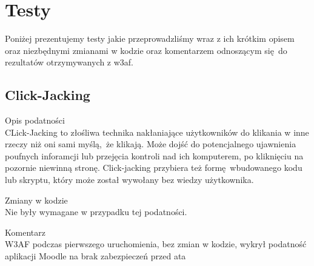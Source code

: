 \chapter{Testy}
\label{cha:testy}

Poniżej prezentujemy testy jakie przeprowadzliśmy wraz z ich krótkim opisem oraz niezbędnymi zmianami w kodzie oraz komentarzem odnoszącym się do rezultatów otrzymywanych z w3af.

\section{Click-Jacking}
\begin{enumerable}
\item Opis podatności\\
CLick-Jacking to złośliwa technika nakłaniające użytkowników do klikania w inne rzeczy niż oni sami myślą, że klikają.
Może dojść do potencjalnego ujawnienia poufnych inforamcji lub przejęcia kontroli nad ich komputerem, po kliknięciu na pozornie niewinną stronę. Click-jacking przybiera też formę wbudowanego kodu lub skryptu, który może został wywołany bez wiedzy użytkownika.
\item Zmiany w kodzie\\
Nie były wymagane w przypadku tej podatności.
\item Komentarz\\
W3AF podczas pierwszego uruchomienia, bez zmian w kodzie, wykrył podatność aplikacji Moodle na brak zabezpieczeń przed ata
\end{enumerable}
